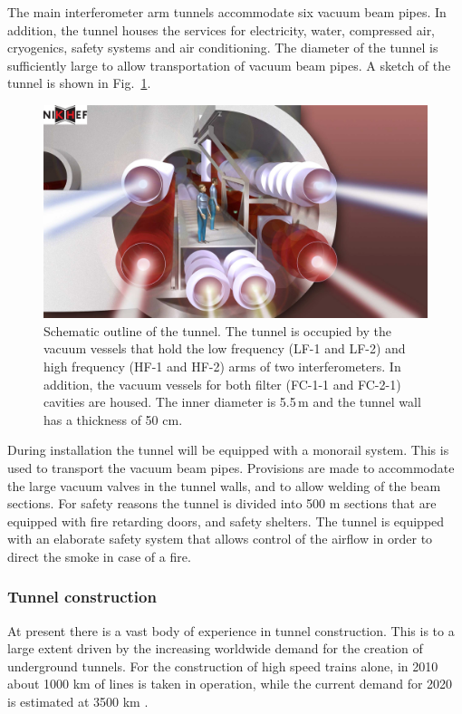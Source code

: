 The main interferometer arm tunnels accommodate six vacuum beam pipes.
In addition, the tunnel houses the services for electricity, water, compressed air,
cryogenics, safety systems and air conditioning. The diameter of the tunnel
is sufficiently large to allow transportation of vacuum beam pipes.
A sketch of the tunnel is shown in Fig.~\ref{fig:infra5}.
\begin{figure}[htbp!]
\centering
\includegraphics[width=17cm]{./Sec_SiteInfra/Figures/Tunnels1.pdf}
\caption{Schematic outline of the tunnel.
The tunnel is occupied by the vacuum vessels that hold the low frequency (LF-1 and LF-2)
and high frequency (HF-1 and HF-2) arms of two interferometers. In addition, the vacuum vessels
for both filter (FC-1-1 and FC-2-1) cavities are housed. The inner diameter is 5.5\,m and the tunnel
wall has a thickness of 50 cm.}
\label{fig:infra5}
\end{figure}
During installation the tunnel will be equipped with a monorail system.
This is used to transport the vacuum beam pipes. Provisions are made
to accommodate the large vacuum valves in the tunnel walls, and to allow
welding of the beam sections. For safety reasons the tunnel is divided
into 500 m sections that are equipped with fire retarding doors, and safety
shelters. The tunnel is equipped with an elaborate safety system that
allows control of the airflow in order to direct the smoke in case of a fire.

\subsubsection*{Tunnel construction}

At present there is a vast body of experience in tunnel construction.
This is to a large extent driven by the increasing worldwide demand 
for the creation of underground tunnels.
For the construction of high speed trains alone, in 2010
about 1000 km of lines is taken in operation, while the current demand
for 2020 is estimated at 3500 km \cite{itacet}.

